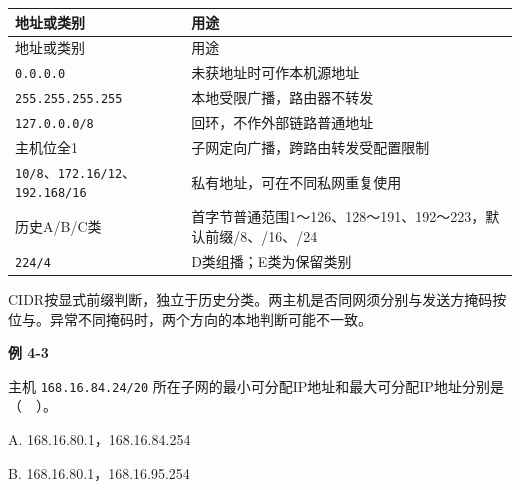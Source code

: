 \par\smallskip
\begin{wideblock}
{\fontsize{9.3}{12}\selectfont\setlength{\tabcolsep}{2.5pt}\setlength{\LTleft}{0pt}\setlength{\LTright}{0pt}
\begin{longtable}{@{}>{\raggedright\arraybackslash}p{}>{\raggedright\arraybackslash}p{}@{}}
\toprule
地址或类别 & 用途 \\

\midrule\endfirsthead\toprule
地址或类别 & 用途 \\

\midrule\endhead\bottomrule\endfoot
\texttt{0.0.0.0} & 未获地址时可作本机源地址 \\

\texttt{255.255.255.255} & 本地受限广播，路由器不转发 \\

\texttt{127.0.0.0/8} & 回环，不作外部链路普通地址 \\

主机位全1 & 子网定向广播，跨路由转发受配置限制 \\

\texttt{10/8}、\texttt{172.16/12}、\texttt{192.168/16} & 私有地址，可在不同私网重复使用 \\

历史A/B/C类 & 首字节普通范围1～126、128～191、192～223，默认前缀/8、/16、/24 \\

\texttt{224/4} & D类组播；E类为保留类别 \\

\end{longtable}}
\end{wideblock}
\par\smallskip

CIDR按显式前缀判断，独立于历史分类。两主机是否同网须分别与发送方掩码按位与。异常不同掩码时，两个方向的本地判断可能不一致。

\par\medskip{}\noindent\hypertarget{CN04-E03}{}\label{CN04-E03}\textbf{例 4-3}\par\nobreak\smallskip

主机 \texttt{168.\allowbreak{}16.\allowbreak{}84.\allowbreak{}24/\allowbreak{}20} 所在子网的最小可分配IP地址和最大可分配IP地址分别是（　）。

A. 168.16.80.1，168.16.84.254

B. 168.16.80.1，168.16.95.254

